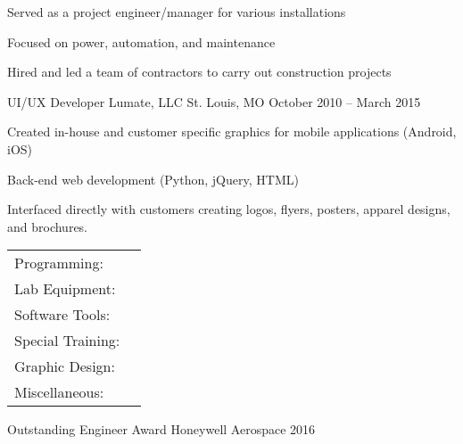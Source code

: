 \documentclass[]{awesome-cv}
\begin{document}
\begin{cventries}
	{\begin{cvitems}
		\item {Served as a project engineer/manager for various installations}
		\item {Focused on power, automation, and maintenance}
		\item {Hired and led a team of contractors to carry out construction projects}
		\end{cvitems}}
	\cventry
	{UI/UX Developer}
	{Lumate, LLC}
	{St. Louis, MO}
	{October 2010 – March 2015}
	{\begin{cvitems}
		\item {Created in-house and customer specific graphics for mobile applications (Android, iOS)}
		\item {Back-end web development (Python, jQuery, HTML)}
		\item {Interfaced directly with customers creating logos, flyers, posters, apparel designs, and brochures.}
		\end{cvitems}}
\end{cventries}
\begin{cventries}
	\cventry
	{}
	{\def\arraystretch{1.15}{\begin{tabular}{ l l}
		Programming:  & {\skill{ VB.NET, Python, Java, MATLAB, Powershell, Github, Subversion, TestStand, ADB, VISA}} \\
		Lab Equipment:  & {\skill{ Oscilloscopes, DMM, VNA, power supplies, multi-meters, Raspberry Pi, Arduino, PXI}} \\
		Software Tools:  & {\skill{ Schematic capture, PCB layout, Mentor Graphics, CADSTAR, OrCad, SPICE, Solidworks}} \\
		Special Training:  & {\skill{ Advanced GNSS/GPS, Radar Systems Certificate, MIL-STD 1553}} \\
		Graphic Design:  & {\skill{ Photoshop, Illustrator, LaTeX}} \\
		Miscellaneous:  & {\skill{ MS Office, MS Project, Excel, Android, Linux, Windows, Jira}} \\
		\end{tabular}}}
	{}
	{}
	{}
\end{cventries}

\vspace{-7mm}

\begin{cvhonors}
	\cvhonor
	{Outstanding Engineer Award}
	{Honeywell Aerospace }
	{}
	{2016}
\end{cvhonors}
\end{document}
